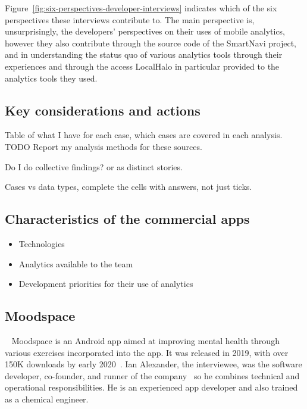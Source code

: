 Figure~\ref{fig:six-perspectives-developer-interviews} indicates which of the six perspectives these interviews contribute to. The main perspective is, unsurprisingly, the developers' perspectives on their uses of mobile analytics, however they also contribute through the source code of the SmartNavi project, and in understanding the status quo of various analytics tools through their experiences and through the access LocalHalo in particular provided to the analytics tools they used.


\dotfill
\subsection{Key considerations and actions}
Table of what I have for each case, which cases are covered in each analysis.
TODO Report my analysis methods for these sources.

Do I do collective findings? or as distinct stories.

Cases vs data types, complete the cells with answers, not just ticks.


\subsection{Characteristics of the commercial apps}

\begin{itemize}
    \item Technologies
    \item Analytics available to the team
    \item Development priorities for their use of analytics
\end{itemize}

\clearpage


\clearpage
\subsection{Moodspace}~\label{study-moodspace}
Moodspace is an Android app aimed at improving mental health through various exercises incorporated into the app. It was released in 2019, with over 150K downloads by early 2020~\citep{objectbox2020_moodspace_interview}. Ian Alexander, the interviewee, was the software developer, co-founder, and runner of the company~\citep{objectbox2020_moodspace_interview} so he combines technical and operational responsibilities. He is an experienced app developer and also trained as a chemical engineer.  %

